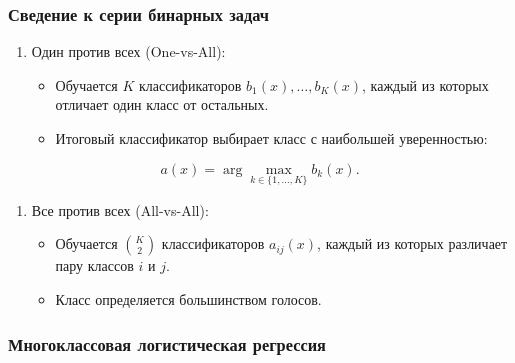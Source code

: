 \hypertarget{ux441ux432ux435ux434ux435ux43dux438ux435-ux43a-ux441ux435ux440ux438ux438-ux431ux438ux43dux430ux440ux43dux44bux445-ux437ux430ux434ux430ux447}{%
\subsubsection*{Сведение к серии бинарных
задач}\label{ux441ux432ux435ux434ux435ux43dux438ux435-ux43a-ux441ux435ux440ux438ux438-ux431ux438ux43dux430ux440ux43dux44bux445-ux437ux430ux434ux430ux447}}

\begin{enumerate}
\def\labelenumi{\arabic{enumi}.}
\tightlist
\item
  Один против всех (One-vs-All):

  \begin{itemize}
  \tightlist
  \item
    Обучается \(K\) классификаторов \(b_1(x), \ldots, b_K(x)\), каждый
    из которых отличает один класс от остальных.
  \item
    Итоговый классификатор выбирает класс с наибольшей уверенностью:
  \end{itemize}
\end{enumerate}

\begin{equation}
a(x) = \arg\max_{k \in \{1, \ldots, K\}} b_k(x).
\end{equation}

\begin{enumerate}
\def\labelenumi{\arabic{enumi}.}
\setcounter{enumi}{1}
\tightlist
\item
  Все против всех (All-vs-All):

  \begin{itemize}
  \tightlist
  \item
    Обучается \(\binom{K}{2}\) классификаторов \(a_{ij}(x)\), каждый из
    которых различает пару классов \(i\) и \(j\).
  \item
    Класс определяется большинством голосов.
  \end{itemize}
\end{enumerate}

\hypertarget{ux43cux43dux43eux433ux43eux43aux43bux430ux441ux441ux43eux432ux430ux44f-ux43bux43eux433ux438ux441ux442ux438ux447ux435ux441ux43aux430ux44f-ux440ux435ux433ux440ux435ux441ux441ux438ux44f}{%
\subsubsection*{Многоклассовая логистическая
регрессия}\label{ux43cux43dux43eux433ux43eux43aux43bux430ux441ux441ux43eux432ux430ux44f-ux43bux43eux433ux438ux441ux442ux438ux447ux435ux441ux43aux430ux44f-ux440ux435ux433ux440ux435ux441ux441ux438ux44f}}

